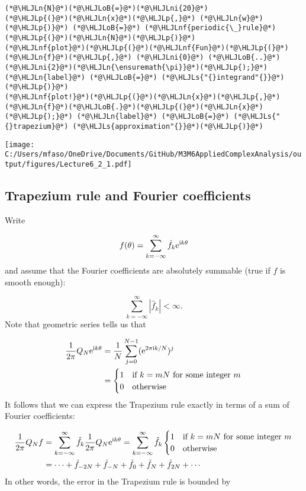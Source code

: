 \documentclass[12pt,landscape]{article}
\newcommand{\HLJLn}[1]{#1}
\newcommand{\HLJLnf}[1]{\textcolor[RGB]{66,102,213}{#1}}
\newcommand{\HLJLs}[1]{\textcolor[RGB]{201,61,57}{#1}}
\newcommand{\HLJLni}[1]{\textcolor[RGB]{59,151,46}{#1}}
\newcommand{\HLJLoB}[1]{\textcolor[RGB]{102,102,102}{\textbf{#1}}}
\newcommand{\HLJLp}[1]{#1}
\def\I{ {\rm i} }
\def\E{ {\rm e} }
\def\cent#1{\begin{center}#1\end{center} }
\begin{document}
{\begin{lstlisting}
(*@\HLJLn{N}@*)(*@\HLJLoB{=}@*)(*@\HLJLni{20}@*)
(*@\HLJLp{(}@*)(*@\HLJLn{x}@*)(*@\HLJLp{,}@*) (*@\HLJLn{w}@*)(*@\HLJLp{)}@*) (*@\HLJLoB{=}@*) (*@\HLJLnf{periodic{\_}rule}@*)(*@\HLJLp{(}@*)(*@\HLJLn{N}@*)(*@\HLJLp{)}@*)
(*@\HLJLnf{plot}@*)(*@\HLJLp{(}@*)(*@\HLJLnf{Fun}@*)(*@\HLJLp{(}@*)(*@\HLJLn{f}@*)(*@\HLJLp{,}@*) (*@\HLJLni{0}@*) (*@\HLJLoB{..}@*) (*@\HLJLni{2}@*)(*@\HLJLn{\ensuremath{\pi}}@*)(*@\HLJLp{);}@*) (*@\HLJLn{label}@*) (*@\HLJLoB{=}@*) (*@\HLJLs{"{}integrand"{}}@*)(*@\HLJLp{)}@*)
(*@\HLJLnf{plot!}@*)(*@\HLJLp{(}@*)(*@\HLJLn{x}@*)(*@\HLJLp{,}@*) (*@\HLJLn{f}@*)(*@\HLJLoB{.}@*)(*@\HLJLp{(}@*)(*@\HLJLn{x}@*)(*@\HLJLp{);}@*) (*@\HLJLn{label}@*) (*@\HLJLoB{=}@*) (*@\HLJLs{"{}trapezium}@*) (*@\HLJLs{approximation"{}}@*)(*@\HLJLp{)}@*)
\end{lstlisting}

\cent{\texttt{[image: C:/Users/mfaso/OneDrive/Documents/GitHub/M3M6AppliedComplexAnalysis/output/figures/Lecture6\_2\_1.pdf]}}

\subsection{Trapezium rule and Fourier coefficients}
Write

\[
f(\theta) = \sum_{k=-\infty}^\infty \hat f_k \E^{\I k \theta}
\]
and assume that the Fourier coefficients are absolutely summable (true if $f$ is smooth enough):

\[
\sum_{k=-\infty}^\infty |\hat f_k| < \infty.
\]
\newpage
Note that geometric series tells us that


\begin{align*}
{1 \over 2 \pi} Q_N \E^{\I k \theta} &= {1 \over N} \sum_{j=0}^{N-1} (\E^{2 \pi \I k /N})^j \\
    &= \begin{cases}
        1 & \hbox{if $k = m N$ for some integer $m$} \\
        0 & \hbox{otherwise}
    \end{cases}
\end{align*}
It follows that we can express the Trapezium rule exactly in terms of a sum of Fourier coefficients:


\begin{align*}
{1 \over 2 \pi} Q_N f &= \sum_{k=-\infty}^\infty \hat f_k {1 \over 2 \pi} Q_N \E^{\I k \theta} = \sum_{k=-\infty}^\infty \hat f_k \begin{cases}
        1 & \hbox{if $k = m N$ for some integer $m$} \\
        0 & \hbox{otherwise}
    \end{cases} \\
    &= \cdots + \hat f_{-2N} + \hat f_{-N} + \hat f_0 + \hat f_N + \hat f_{2N} + \cdots
\end{align*}
In other words, the error in the Trapezium rule is bounded by

}
\end{document}
